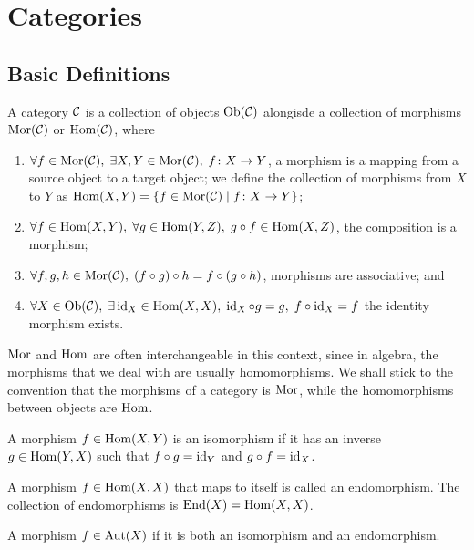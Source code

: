\section{Categories}

\subsection{Basic Definitions}

\begin{definition}
    A category \(\mathcal{C}\) is a collection of objects \(\operatorname{Ob}(\mathcal{C})\)
    alongisde a collection of morphisms \(\operatorname{Mor}(\mathcal{C})\) or \(\operatorname{Hom}(\mathcal{C})\),
    where
    \begin{enumerate}[label={(\roman*)}, itemsep=0mm]
        \item \(\forall f \in \operatorname{Mor}(\mathcal{C}),\; \exists X,Y \in \operatorname{Mor}(\mathcal{C}),\; f\colon X\to Y\),
            a morphism is a mapping from a source object to a target object;
            we define the collection of morphisms from \(X\) to \(Y\)
            as \(\operatorname{Hom}(X,Y) = \{f\in\operatorname{Mor}(\mathcal{C}) \mid f\colon X\to Y\}\);
        \item \(\forall f \in \operatorname{Hom}(X,Y),\; \forall g \in \operatorname{Hom}(Y,Z),\; g \circ f \in \operatorname{Hom}(X,Z)\),
            the composition is a morphism;
        \item \(\forall f,g,h \in \operatorname{Mor}(\mathcal{C}),\; (f \circ g) \circ h = f \circ (g \circ h)\),
            morphisms are associative; and
        \item \(\forall X \in \operatorname{Ob}(\mathcal{C}),\; \exists \operatorname{id}_X \in \operatorname{Hom}(X,X),\; \operatorname{id}_X \circ g = g,\; f \circ \operatorname{id}_X = f\)
            the identity morphism exists.
    \end{enumerate}
\end{definition}
\begin{remark}
    \(\operatorname{Mor}\) and \(\operatorname{Hom}\) are often interchangeable in this context,
    since in algebra, the morphisms that we deal with are usually homomorphisms.
    We shall stick to the convention that the morphisms of a category is \(\operatorname{Mor}\),
    while the homomorphisms between objects are \(\operatorname{Hom}\).
\end{remark}

\begin{definition}
    A morphism \(f \in \operatorname{Hom}(X,Y)\) is an isomorphism
    if it has an inverse \(g \in \operatorname{Hom}(Y,X)\)
    such that \(f \circ g = \operatorname{id}_Y\) and \(g \circ f = \operatorname{id}_X\).
\end{definition}
\begin{definition}
    A morphism \(f \in \operatorname{Hom}(X,X)\) that maps to itself is called an endomorphism.
    The collection of endomorphisms is \(\operatorname{End}(X) = \operatorname{Hom}(X,X)\).
\end{definition}
\begin{definition}
    A morphism \(f \in \operatorname{Aut}(X)\) if it is both an isomorphism and an endomorphism.
\end{definition}

